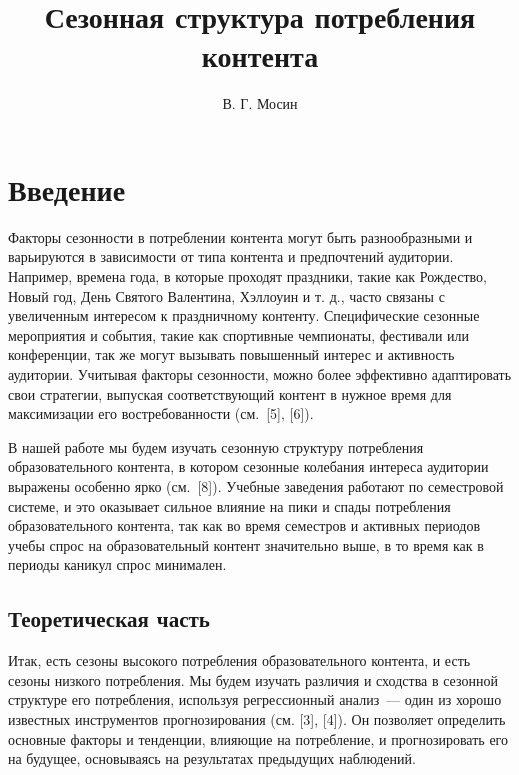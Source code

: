 \documentclass[a4paper,12pt]{article}
\title{Сезонная структура потребления контента }
\author{В. Г. Мосин}
\date{}
\begin{document}
	\maketitle
	
\tableofcontents
	
\section{Введение}
Факторы сезонности в потреблении контента могут быть разнообразными и варьируются в зависимости от типа контента и предпочтений аудитории. Например, времена года, в которые проходят праздники, такие как Рождество, Новый год, День Святого Валентина, Хэллоуин и т. д., часто связаны с увеличенным интересом к праздничному контенту. Специфические сезонные мероприятия и события, такие как спортивные чемпионаты, фестивали или конференции, так же могут вызывать повышенный интерес и активность аудитории. Учитывая факторы сезонности, можно более эффективно адаптировать свои стратегии, выпуская соответствующий контент в нужное время для максимизации его востребованности (см. [5], [6]). 

В нашей работе мы будем изучать сезонную структуру потребления образовательного контента, в котором сезонные колебания интереса аудитории выражены особенно ярко (см. [8]). Учебные заведения работают по семестровой системе, и это оказывает сильное влияние на пики и спады потребления образовательного контента, так как во время семестров и активных периодов учебы спрос на образовательный контент значительно выше, в то время как в периоды каникул спрос минимален.

\subsection{Теоретическая часть}

Итак, есть сезоны высокого потребления образовательного контента, и есть сезоны низкого потребления. Мы будем изучать различия и сходства в сезонной структуре его потребления, используя регрессионный анализ — один из хорошо известных инструментов прогнозирования (см. [3], [4]). Он позволяет определить основные факторы и тенденции, влияющие на потребление, и прогнозировать его на будущее, основываясь на результатах предыдущих наблюдений. 
\end{document}

